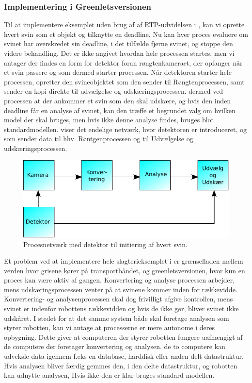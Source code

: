 \subsubsection*{Implementering i Greenletsversionen}
Til at implementere eksemplet uden brug af af RTP-udvidelsen i \pycsp, kan vi oprette hvert svin som et objekt og tilknytte en deadline. Nu kan hver proces evaluere om svinet har overskredet sin deadline, i det tilfælde fjerne svinet, og stoppe den videre behandling. Det er ikke angivet hvordan hele processen startes, men vi antager der findes en form for detektor foran røngtenkameraet, der opfanger når et svin passere og som dermed  starter processen. 
Når detektoren starter hele processen, opretter den svineobjektet som den sender til Røngtenprocessen, samt sender en kopi direkte til udvælgelse og udskæringsprocessen. dermed ved processen at der ankommer et svin som den skal udskære, og hvis den inden deadline får en analyse af svinet, kan den træffe et begrundet valg om hvilken model der skal bruges,  men hvis ikke denne analyse findes, bruges blot standardmodellen.  viser det endelige  netværk, hvor detektoren er introduceret, og som sender data til hhv. Røntgenprocessen og til Udvælgelse og udskæringsprocessen. 

\begin{figure}
 \begin{center}
  \includegraphics[scale=1]{images/pig-network2}
	\caption{Procesnetværk med detektor til initiering af hvert svin.}
	\label{fig:pig-network2}
\end{center}
\end{figure}

Et problem ved at implementere hele slagterieksemplet i \pycsp er  grænsefladen mellem verden hvor grisene kører på transportbåndet, og  greenletsversionen,  hvor  kun en proces kan være aktiv af gangen. Konvertering og analyse processen arbejder, mens  udskæringsprocessen venter på at svinene kommer inden for rækkevidde. Konvertering- og analysenprocessen  skal dog frivilligt afgive kontrollen, mens svinet er indenfor robottens rækkevidden og hvis de ikke gør, bliver svinet ikke udskåret. I stedet for at det samme system både skal foretage analysen som  styrer robotten, kan vi antage at processerne er mere autonome i deres opbygning. Dette giver at computeren der styrer robotten fungere uafhængigt af de computere der foretager konvertering og analysen. de to computere kan udveksle data igennem f.eks en database, harddisk eller anden delt datastruktur. Hvis analysen bliver færdig gemmes den, i den delte datastruktur, og robotten kan udnytte analysen, Hvis ikke den er klar bruges standard modellen.    




